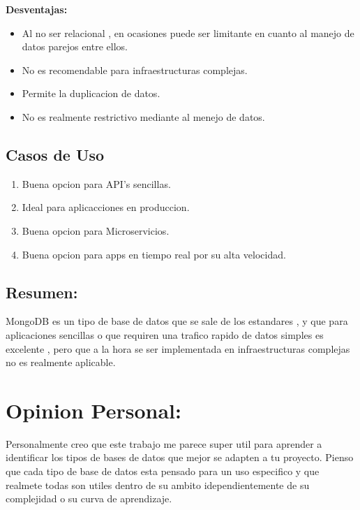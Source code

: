 \documentclass[12pt]{article}
\begin{document}
\textbf{Desventajas:}
\begin{itemize}
    \item Al no ser relacional , en ocasiones puede ser limitante en cuanto al manejo de datos parejos entre ellos.
    \item No es recomendable para infraestructuras complejas.
    \item Permite la duplicacion de datos.
    \item No es realmente restrictivo mediante al menejo de datos.
\end{itemize}

\vspace{1cm}
\subsection{Casos de Uso}

\begin{enumerate}
    \item Buena opcion para API's sencillas.
    \item Ideal para aplicacciones en produccion.
    \item Buena opcion para Microservicios.
    \item Buena opcion para apps en tiempo real por su alta velocidad.
\end{enumerate}

\subsection{Resumen:}
MongoDB es un tipo de base de datos que se sale de los estandares , y que para aplicaciones sencillas o que requiren una trafico rapido de datos simples es excelente , pero que a la hora se ser implementada en infraestructuras complejas no es realmente aplicable.
\newpage
\section{Opinion Personal:}
Personalmente creo que este trabajo me parece super util para aprender a identificar los tipos de bases de datos que mejor se adapten a tu proyecto. Pienso que cada tipo de base de datos esta pensado para un uso especifico y que realmete todas son utiles dentro de su ambito idependientemente de su complejidad o su curva de aprendizaje.
\end{document}
